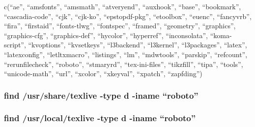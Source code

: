 \documentclass[
]{article}
\newenvironment{Shaded}{\begin{snugshade}}{\end{snugshade}}
\newcommand{\AttributeTok}[1]{\textcolor[rgb]{0.13,0.29,0.53}{#1}}
\newcommand{\ConstantTok}[1]{\textcolor[rgb]{0.56,0.35,0.01}{#1}}
\newcommand{\ControlFlowTok}[1]{\textcolor[rgb]{0.13,0.29,0.53}{\textbf{#1}}}
\newcommand{\DecValTok}[1]{\textcolor[rgb]{0.00,0.00,0.81}{#1}}
\newcommand{\FunctionTok}[1]{\textcolor[rgb]{0.13,0.29,0.53}{\textbf{#1}}}
\newcommand{\NormalTok}[1]{#1}
\newcommand{\SpecialCharTok}[1]{\textcolor[rgb]{0.81,0.36,0.00}{\textbf{#1}}}
\newcommand{\StringTok}[1]{\textcolor[rgb]{0.31,0.60,0.02}{#1}}
\begin{document}
c(``ae'', ``amsfonts'', ``amsmath'', ``atveryend'', ``auxhook'',
``base'', ``bookmark'', ``cascadia-code'', ``cjk'', ``cjk-ko'',
``epstopdf-pkg'', ``etoolbox'', ``euenc'', ``fancyvrb'', ``fira'',
``firstaid'', ``fonts-tlwg'', ``fontspec'', ``framed'', ``geometry'',
``graphics'', ``graphics-cfg'', ``graphics-def'', ``hycolor'',
``hyperref'', ``inconsolata'', ``koma-script'', ``kvoptions'',
``kvsetkeys'', ``l3backend'', ``l3kernel'', ``l3packages'', ``latex'',
``latexconfig'', ``letltxmacro'', ``listings'', ``lm'', ``mdwtools'',
``parskip'', ``refcount'', ``rerunfilecheck'', ``roboto'', ``stmaryrd'',
``tex-ini-files'', ``tikzfill'', ``tipa'', ``tools'', ``unicode-math'',
``url'', ``xcolor'', ``xkeyval'', ``xpatch'', ``zapfding'')

\hypertarget{find-usrsharetexlive--type-d--iname-roboto}{%
\subsubsection{find /usr/share/texlive -type d -iname
``roboto''}\label{find-usrsharetexlive--type-d--iname-roboto}}

\hypertarget{find-usrlocaltexlive--type-d--iname-roboto}{%
\subsubsection{find /usr/local/texlive -type d -iname
``roboto''}\label{find-usrlocaltexlive--type-d--iname-roboto}}

\begin{Shaded}
\end{Shaded}
\end{document}
